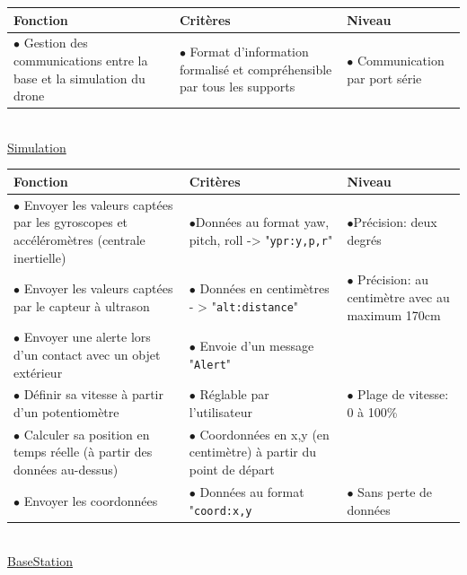 \documentclass[12pt,a4paper]{article}
\begin{document}
\begin{tabular}{|p{6cm}|p{5cm}|p{5cm}|}
	\hline
       Fonction  & Critères  & Niveau\\
    \hline
		$\bullet$ Gestion des communications entre la base et la simulation du drone & $\bullet$ Format d'information formalisé et compréhensible par tous les supports  & $\bullet$ Communication par port série\\
    \hline	
\end{tabular}\\

\underline{Simulation}
\newline


\begin{tabular}{|p{6cm}|p{5cm}|p{5cm}|}
	\hline
       Fonction  & Critères  & Niveau\\
    \hline
		$\bullet$ Envoyer les valeurs captées par les gyroscopes et accéléromètres (centrale inertielle) & $\bullet$Données au format yaw, pitch, roll -> "\texttt{ypr:y,p,r}" & $\bullet$Précision: deux degrés \\
		$\bullet$ Envoyer les valeurs captées par le capteur à ultrason & $\bullet$ Données en centimètres - > "\texttt{alt:distance}" & $\bullet$ Précision: au centimètre avec au maximum 170cm\\

		$\bullet$ Envoyer une alerte lors d'un contact avec un objet extérieur & $\bullet$ Envoie d'un message "\texttt{Alert}" & \\

		$\bullet$ Définir sa vitesse à partir d'un potentiomètre & $\bullet$ Réglable par l'utilisateur & $\bullet$ Plage de vitesse: 0 à 100\%\\
		$\bullet$ Calculer sa position en temps réelle (à partir des données au-dessus)  & $\bullet$ Coordonnées en x,y (en centimètre) à partir du point de départ & \\
    	$\bullet$ Envoyer les coordonnées & $\bullet$ Données au format "\texttt{coord:x,y} & $\bullet$ Sans perte de données\\
    \hline
\end{tabular}\\
	

\underline{BaseStation}
\newline
\end{document}
